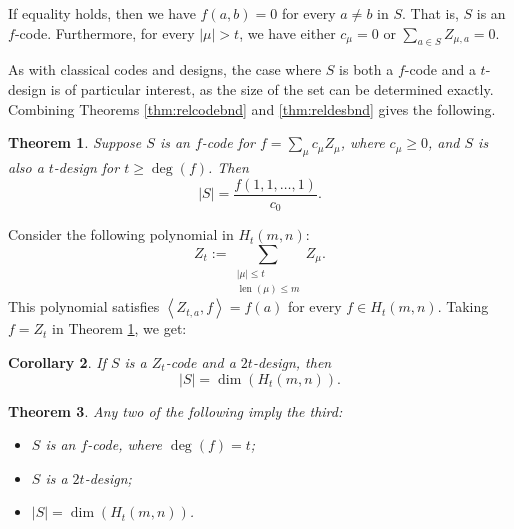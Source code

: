 \documentclass[12pt]{article}
\numberwithin{equation}{section}
\theoremstyle{plainsl}
\newtheorem{theorem}{Theorem}[section]
\newtheorem{corollary}[theorem]{Corollary}
\newcommand\ip[2]{\left\langle#1,#2\right\rangle}
\newcommand\abs[1]{\left|#1\right|}
\newcommand\opk[1]{\mathop{\mathrm{#1}}\nolimits}
\newcommand\len{\opk{len}}
\begin{document}
If equality holds, then we have $f(a,b) = 0$ for every $a \neq b$ in $S$. That is, $S$ is an $f$-code. Furthermore, for every $\abs{\mu} > t$, we have either $c_\mu = 0$ or $\sum_{a \in S} Z_{\mu,a} = 0$.

As with classical codes and designs, the case where $S$ is both a $f$-code and a $t$-design is of particular interest, as the size of the set can be determined exactly. Combining Theorems \ref{thm:relcodebnd} and \ref{thm:reldesbnd} gives the following.

\begin{theorem}
\label{thm:absdescode}
Suppose $S$ is an $f$-code for $f = \sum_\mu c_\mu Z_\mu$, where $c_\mu \geq 0$, and $S$ is also a $t$-design for $t \geq \deg(f)$. Then
\[
|S| = \frac{f(1,1,\ldots,1)}{c_0}.
\]
\end{theorem}

Consider the following polynomial in $H_t(m,n)$: 
\[
Z_t := \sum_{\substack{\abs{\mu} \leq t \\ \len(\mu) \leq m}} Z_\mu.
\]
This polynomial satisfies $\ip{Z_{t,a}}{f} = f(a)$ for every $f \in H_t(m,n)$. Taking $f = Z_t$ in Theorem \ref{thm:absdescode}, we get:

\begin{corollary}
If $S$ is a $Z_t$-code and a $2t$-design, then 
\[
|S| = \dim(H_t(m,n)).
\] 
\end{corollary}

\begin{theorem}
\label{thm:twothree}
Any two of the following imply the third:
\begin{itemize}
\item $S$ is an $f$-code, where $\deg(f) = t$;
\item $S$ is a $2t$-design;
\item $|S| = \dim(H_t(m,n))$.
\end{itemize}
\end{theorem}
\end{document}
